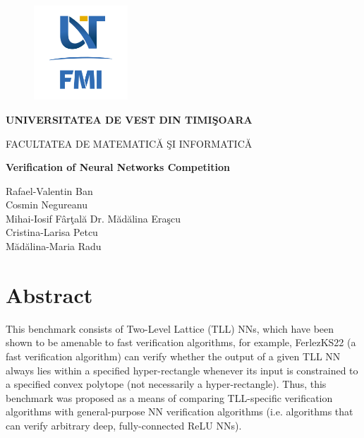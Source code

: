 \documentclass[12pt,a4paper]{report}
\theoremstyle{definition}
\theoremstyle{remark}
\begin{document}
\thispagestyle{empty}
\begin{center}
\begin{figure}[h!]
\vspace{-20pt}
\begin{center}
\includegraphics[width=100pt]{FMI-03.png}
\end{center}
\end{figure}

{\large{\bf UNIVERSITATEA DE VEST DIN TIMI\c SOARA

FACULTATEA DE MATEMATIC\u A \c SI INFORMATIC\u A}}

\vspace{65pt}
{\huge {\bf Verification of Neural Networks Competition}}

\vspace{65pt}
\end{center}

\noindent Rafael-Valentin Ban\\
\noindent Cosmin Negureanu\\
\noindent Mihai-Iosif F\^{a}r\c tal\u a \hfill Dr. M\u ad\u alina Era\c scu\\
\noindent Cristina-Larisa Petcu\\
\noindent M\u ad\u alina-Maria Radu\\

\vspace{65pt}
\section*{Abstract}
This benchmark consists of Two-Level Lattice (TLL) NNs, which have been shown to be amenable to fast verification algorithms, for example, FerlezKS22\cite{tll_fast_algorithm} (a fast verification algorithm) can verify whether the output of a given TLL NN always lies within a specified hyper-rectangle whenever its input is constrained to a specified convex polytope (not necessarily a hyper-rectangle).\cite{tll_fast_algorithm} Thus, this benchmark was proposed as a means of comparing TLL-specific verification algorithms with general-purpose NN verification algorithms (i.e. algorithms that can verify arbitrary deep, fully-connected ReLU NNs).\cite{tll_git}
\tableofcontents
\end{document}
